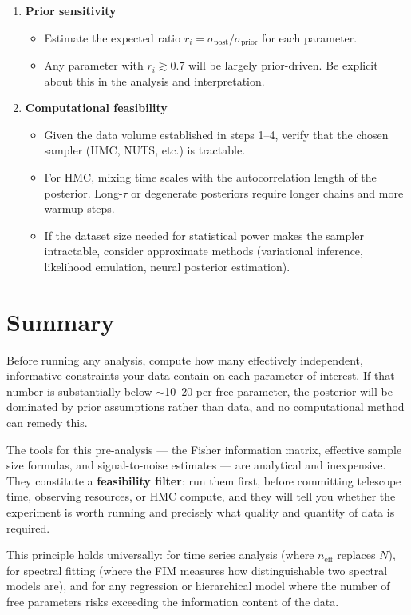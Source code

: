 \documentclass[11pt, a4paper]{article}
\begin{document}
\begin{enumerate}[label=\textbf{\arabic*.}, leftmargin=*, itemsep=6pt]
    \item \textbf{Prior sensitivity}
    \begin{itemize}[noitemsep]
        \item Estimate the expected ratio $r_i = \sigma_\mathrm{post} / \sigma_\mathrm{prior}$
              for each parameter.
        \item Any parameter with $r_i \gtrsim 0.7$ will be largely prior-driven.
              Be explicit about this in the analysis and interpretation.
    \end{itemize}

    \item \textbf{Computational feasibility}
    \begin{itemize}[noitemsep]
        \item Given the data volume established in steps 1--4, verify that the chosen
              sampler (HMC, NUTS, etc.) is tractable.
        \item For HMC, mixing time scales with the autocorrelation length of the
              posterior. Long-$\tau$ or degenerate posteriors require longer chains
              and more warmup steps.
        \item If the dataset size needed for statistical power makes the sampler
              intractable, consider approximate methods (variational inference,
              likelihood emulation, neural posterior estimation).
    \end{itemize}

\end{enumerate}


\section{Summary}

\begin{keybox}
Before running any analysis, compute how many effectively independent, informative
constraints your data contain on each parameter of interest. If that number is
substantially below $\sim$10--20 per free parameter, the posterior will be dominated
by prior assumptions rather than data, and no computational method can remedy this.

\medskip
The tools for this pre-analysis --- the Fisher information matrix, effective sample
size formulas, and signal-to-noise estimates --- are analytical and inexpensive.
They constitute a \textbf{feasibility filter}: run them first, before committing
telescope time, observing resources, or HMC compute, and they will tell you whether
the experiment is worth running and precisely what quality and quantity of data is
required.

\medskip
This principle holds universally: for time series analysis (where $n_\mathrm{eff}$
replaces $N$), for spectral fitting (where the FIM measures how distinguishable
two spectral models are), and for any regression or hierarchical model where the
number of free parameters risks exceeding the information content of the data.
\end{keybox}
\end{document}
